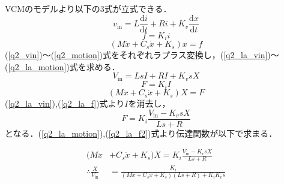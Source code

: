 \documentclass[a4j,11pt]{jarticle}
\begin{document}

VCMのモデルより以下の3式が立式できる．\cite{intuitive2019}
%
\begin{equation}
	\label{q2_vin}
	v_\mathrm{in} = L \frac{\mathrm{d}i}{\mathrm{d}t} + Ri + K_v \frac{\mathrm{d}x}{\mathrm{d}t}
\end{equation}
%
\begin{equation}
	\label{q2_f}
	f = K_i i
\end{equation}
%
\begin{equation}
	\label{q2_motion}
	(M \ddot{x} + C_s \dot{x} + K_s) x = f
\end{equation}
\vspace{8mm}
%
(\ref{q2_vin})～(\ref{q2_motion})式をそれぞれラプラス変換し，(\ref{q2_la_vin})～(\ref{q2_la_motion})式を求める．
\newpage
\begin{equation}
	\label{q2_la_vin}
	V_\mathrm{in} = L s I + R I + K_vsX
\end{equation}
%
\begin{equation}
	\label{q2_la_f}
	F = K_i I
\end{equation}
%
\begin{equation}
	\label{q2_la_motion}
	(M \ddot{x} + C_s \dot{x} + K_s)X = F
\end{equation}
%
(\ref{q2_la_vin}),(\ref{q2_la_f})式より$I$を消去し，
\begin{equation}
	\label{q2_la_f2}
	F = K_i \frac{V_\mathrm{in} - K_v s X}{Ls + R}
\end{equation}
となる．(\ref{q2_la_motion}),(\ref{q2_la_f2})式より伝達関数が以下で求まる．

\begin{align}
	\label{la_x}
	(M \ddot{x}                        & + C_s \dot{x} + K_s) X = K_i \frac{V_\mathrm{in} - K_v s X}{Ls + R} \\
	\therefore \frac{X}{V_\mathrm{in}} & = \frac{K_i}{(M \ddot{x} + C_s \dot{x} + K_s)(Ls+R) + K_i K_v s}    
\end{align}
\end{document}
